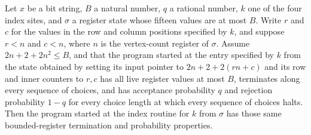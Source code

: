 \begin{lemma}
\label{Complexity.LogProg.ups_index}
\leanok
{}
Let $x$ be a bit string, $B$ a natural number, $q$ a rational number, $k$ one of the
four index sites, and $\sigma$ a register state whose fifteen values are at most $B$.
Write $r$ and $c$ for the values in the row and column positions specified by $k$, and
suppose $r<n$ and $c<n$, where $n$ is the vertex-count register of $\sigma$. Assume
$2n+2+2n^2\le B$, and that the program started at the entry specified by $k$ from the
state obtained by setting its input pointer to $2n+2+2(rn+c)$ and its row and inner
counters to $r,c$ has all live register values at most $B$, terminates along every
sequence of choices, and has acceptance probability $q$ and rejection probability $1-q$
for every choice length at which every sequence of choices halts. Then the program
started at the index routine for $k$ from $\sigma$ has those same bounded-register
termination and probability properties.
\end{lemma}
